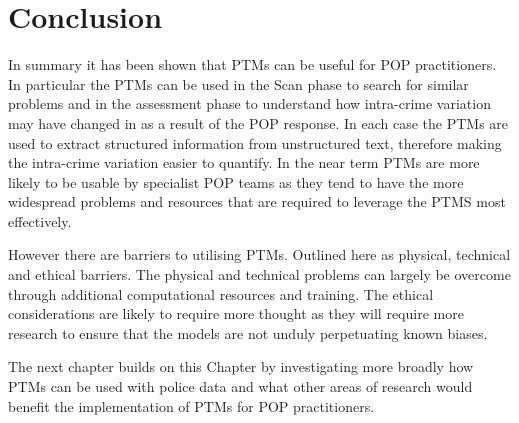\section{Conclusion} In summary it has been shown that PTMs can be useful for POP practitioners. In particular the PTMs can be used in the Scan phase to search for similar problems and in the assessment phase to understand how intra-crime variation may have changed in as a result of the POP response. In each case the PTMs are used to extract structured information from unstructured text, therefore making the intra-crime variation easier to quantify. In the near term PTMs are more likely to be usable by specialist POP teams as they tend to have the more widespread problems and resources that are required to leverage the PTMS most effectively. 

However there are barriers to utilising PTMs. Outlined here as physical, technical and ethical barriers. The physical and technical problems can largely be overcome through additional computational resources and training. The ethical considerations are likely to require more thought as they will require more research to ensure that the models are not unduly perpetuating known biases. 

The next chapter builds on this Chapter by investigating more broadly how PTMs can be used with police data and what other areas of research would benefit the implementation of PTMs for POP practitioners. 


